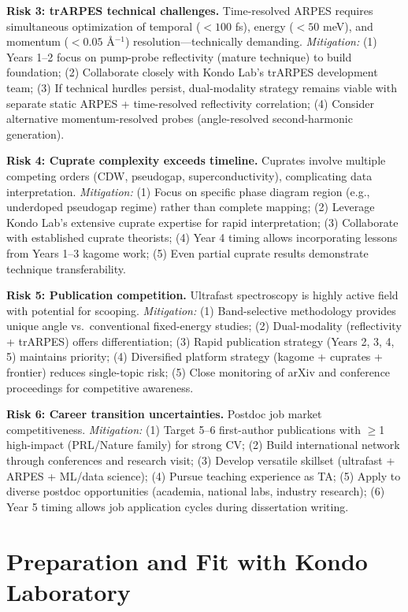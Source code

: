 \documentclass[12pt,a4paper]{article}
\begin{document}
\textbf{Risk 3: trARPES technical challenges.} Time-resolved ARPES requires simultaneous optimization of temporal ($<100$ fs), energy ($<50$ meV), and momentum ($<0.05$ Å$^{-1}$) resolution—technically demanding. \textit{Mitigation:} (1) Years 1--2 focus on pump-probe reflectivity (mature technique) to build foundation; (2) Collaborate closely with Kondo Lab's trARPES development team; (3) If technical hurdles persist, dual-modality strategy remains viable with separate static ARPES + time-resolved reflectivity correlation; (4) Consider alternative momentum-resolved probes (angle-resolved second-harmonic generation).

\textbf{Risk 4: Cuprate complexity exceeds timeline.} Cuprates involve multiple competing orders (CDW, pseudogap, superconductivity), complicating data interpretation. \textit{Mitigation:} (1) Focus on specific phase diagram region (e.g., underdoped pseudogap regime) rather than complete mapping; (2) Leverage Kondo Lab's extensive cuprate expertise for rapid interpretation; (3) Collaborate with established cuprate theorists; (4) Year 4 timing allows incorporating lessons from Years 1--3 kagome work; (5) Even partial cuprate results demonstrate technique transferability.

\textbf{Risk 5: Publication competition.} Ultrafast spectroscopy is highly active field with potential for scooping. \textit{Mitigation:} (1) Band-selective methodology provides unique angle vs.~conventional fixed-energy studies; (2) Dual-modality (reflectivity + trARPES) offers differentiation; (3) Rapid publication strategy (Years 2, 3, 4, 5) maintains priority; (4) Diversified platform strategy (kagome + cuprates + frontier) reduces single-topic risk; (5) Close monitoring of arXiv and conference proceedings for competitive awareness.

\textbf{Risk 6: Career transition uncertainties.} Postdoc job market competitiveness. \textit{Mitigation:} (1) Target 5--6 first-author publications with $\geq$1 high-impact (PRL/Nature family) for strong CV; (2) Build international network through conferences and research visit; (3) Develop versatile skillset (ultrafast + ARPES + ML/data science); (4) Pursue teaching experience as TA; (5) Apply to diverse postdoc opportunities (academia, national labs, industry research); (6) Year 5 timing allows job application cycles during dissertation writing.

\section{Preparation and Fit with Kondo Laboratory}
\end{document}
